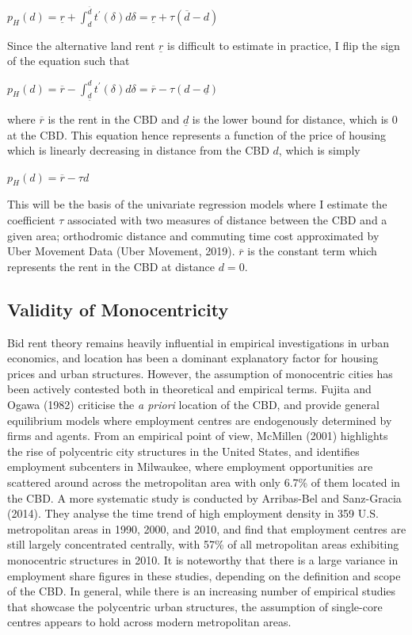 \documentclass{article}
\begin{document}
\begin{center}
$p _ { H } ( d ) = \underline { r } + \int _ { d } ^ { \overline { d } } t ^ { \prime } ( \delta ) d \delta = \underline { r } + \tau ( \overline { d } - d )$
\end{center}
Since the alternative land rent $\underline{r}$ is difficult to estimate in practice, I flip the sign of the equation such that 
\begin{center}
$p _ { H } ( d ) = \overline { r } - \int _ { \underline { d } } ^ { d } t ^ { \prime } ( \delta ) d \delta = \overline { r } - \tau ( d - \underline { d } )$
\end{center}
where $\overline{r}$ is the rent in the CBD and $\underline{d}$ is the lower bound for distance, which is 0 at the CBD. This equation hence represents a function of the price of housing which is linearly decreasing in distance from the CBD $d$, which is simply
\begin{center}
$p _ { H } ( d ) = \overline { r } - \tau d$
\end{center}
This will be the basis of the univariate regression models where I estimate the coefficient $\tau$ associated with two measures of distance between the CBD and a given area; orthodromic distance and commuting time cost approximated by Uber Movement Data (Uber Movement, 2019). $\overline{r}$ is the constant term which represents the rent in the CBD at distance $d = 0$.

\subsection{Validity of Monocentricity} \label{subsection:monocentricity}
Bid rent theory remains heavily influential in empirical investigations in urban economics, and location has been a dominant explanatory factor for housing prices and urban structures. However, the assumption of monocentric cities has been actively contested both in theoretical and empirical terms. Fujita and Ogawa (1982) criticise the \textit{a priori} location of the CBD, and provide general equilibrium models where employment centres are endogenously determined by firms and agents.
From an empirical point of view, McMillen (2001) highlights the rise of polycentric city structures in the United States, and identifies employment subcenters in Milwaukee, where employment opportunities are scattered around across the metropolitan area with only 6.7\% of them located in the CBD. A more systematic study is conducted by Arribas-Bel and Sanz-Gracia (2014). They analyse the time trend of high employment density in 359 U.S. metropolitan areas in 1990, 2000, and 2010, and find that employment centres are still largely concentrated centrally, with 57\% of all metropolitan areas exhibiting monocentric structures in 2010. It is noteworthy that there is a large variance in employment share figures in these studies, depending on the definition and scope of the CBD. In general, while there is an increasing number of empirical studies that showcase the polycentric urban structures, the assumption of single-core centres appears to hold across modern metropolitan areas. 
\end{document}
